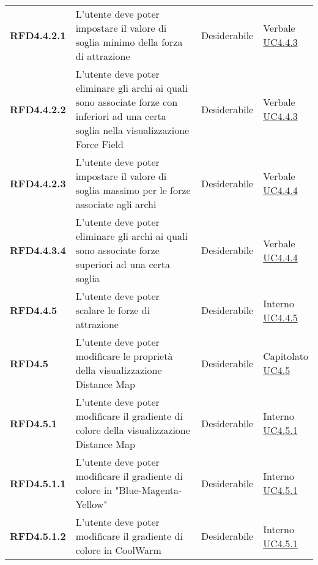 \begin{longtable}[H]{| >{\raggedright\bfseries}m{20mm} | >{\raggedright}m{90mm} | >{\centering}m{25mm} | >{\centering\arraybackslash}m{30mm}|}
    RFD4.4.2.1
    & L'utente deve poter impostare il valore di soglia minimo della forza di attrazione
    & Desiderabile
    & \makecell{ Verbale \\ \hyperref[par:uc4.4.3]{UC4.4.3} }\\

    RFD4.4.2.2
    & L'utente deve poter eliminare gli archi ai quali sono associate forze con inferiori ad una certa soglia
    nella visualizzazione Force Field
    & Desiderabile
    & \makecell{ Verbale \\ \hyperref[par:uc4.4.3]{UC4.4.3} }\\


    RFD4.4.2.3
    & L'utente deve poter impostare il valore di soglia massimo per le forze associate agli archi
    & Desiderabile
    & \makecell{ Verbale \\ \hyperref[par:uc4.4.4]{UC4.4.4} }\\

    RFD4.4.3.4
    & L'utente deve poter eliminare gli archi ai quali sono associate forze superiori ad una certa soglia
    & Desiderabile
    & \makecell{ Verbale \\ \hyperref[par:uc4.4.4]{UC4.4.4} }\\

    RFD4.4.5
    & L'utente deve poter scalare le forze di attrazione
    & Desiderabile
    & \makecell{ Interno \\ \hyperref[par:uc4.4.5]{UC4.4.5} }\\

    RFD4.5
    & L'utente deve poter modificare le proprietà della visualizzazione Distance Map
    & Desiderabile
    & \makecell{ Capitolato \\ \hyperref[ssub:uc4.5]{UC4.5} }\\

    RFD4.5.1
    & L'utente deve poter modificare il gradiente di colore della visualizzazione Distance Map
    & Desiderabile
    & \makecell{ Interno \\ \hyperref[par:uc4.5.1]{UC4.5.1} }\\

    RFD4.5.1.1
    & L'utente deve poter modificare il gradiente di colore in "Blue-Magenta-Yellow"
    & Desiderabile
    & \makecell{ Interno \\ \hyperref[par:uc4.5.1]{UC4.5.1} }\\

    RFD4.5.1.2
    & L'utente deve poter modificare il gradiente di colore in CoolWarm
    & Desiderabile
    & \makecell{ Interno \\ \hyperref[par:uc4.5.1]{UC4.5.1} }\\


\end{longtable}
